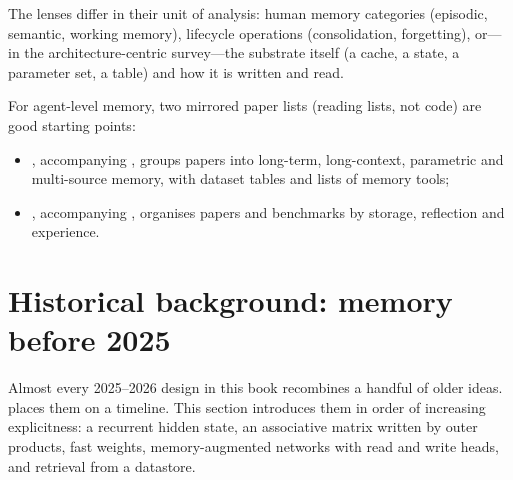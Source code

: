The lenses differ in their unit of analysis: human memory categories (episodic, semantic, working
memory), lifecycle operations (consolidation, forgetting), or---in the architecture-centric
survey---the substrate itself (a cache, a state, a parameter set, a table) and how it is written and
read.

For agent-level memory, two mirrored paper lists (reading lists, not code) are good starting points:
\begin{itemize}[itemsep=0pt]
  \item {}, accompanying \citet{du2025rethinking}, groups
        papers into long-term, long-context, parametric and multi-source memory, with dataset tables
        and lists of memory tools;
  \item {}, accompanying \citet{luo2026storage},
        organises papers and benchmarks by storage, reflection and experience.
\end{itemize}

\section{Historical background: memory before 2025}\label{sec:c02-history}

Almost every 2025--2026 design in this book recombines a handful of older ideas.
 places them on a timeline. This section introduces them in order of
increasing explicitness: a recurrent hidden state, an associative matrix written by outer
products, fast weights, memory-augmented networks with read and write heads, and retrieval from
a datastore.


